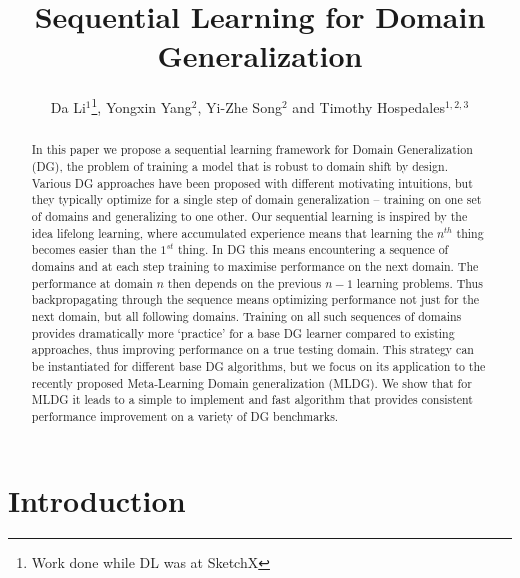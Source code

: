\documentclass[runningheads]{llncs}
\begin{document}
\title{Sequential Learning for Domain Generalization}
\author{Da Li$^{1}$\thanks{Work done while DL was at SketchX}, Yongxin Yang$^2$, Yi-Zhe Song$^2$ and Timothy Hospedales$^{1,2,3}$}
\maketitle              \begin{abstract}
In this paper we propose a sequential learning framework for Domain Generalization (DG), the problem of training a model that is robust to domain shift by design. Various DG approaches have been proposed with different motivating intuitions, but they typically optimize for a single step of domain generalization -- training on one set of domains and generalizing to one other. Our sequential learning is inspired by the idea lifelong learning, where accumulated experience means that learning the $n^{th}$ thing becomes easier than the $1^{st}$ thing. In DG this means encountering a sequence of domains and at each step training to maximise performance on the next domain. The performance at domain $n$ then depends on the previous $n-1$ learning problems. Thus backpropagating through the sequence means optimizing performance not just for the next domain, but all following domains. Training on all such sequences of domains provides dramatically more `practice' for a base DG learner compared to existing approaches, thus improving performance on a true testing domain. This strategy can be instantiated for different base DG algorithms, but we focus on its application to the recently proposed Meta-Learning Domain generalization (MLDG). We show that for MLDG it leads to a simple to implement and fast algorithm that provides consistent performance improvement on a variety of DG benchmarks. 

\end{abstract}
\section{Introduction}
\label{sec:introduction}
\end{document}
